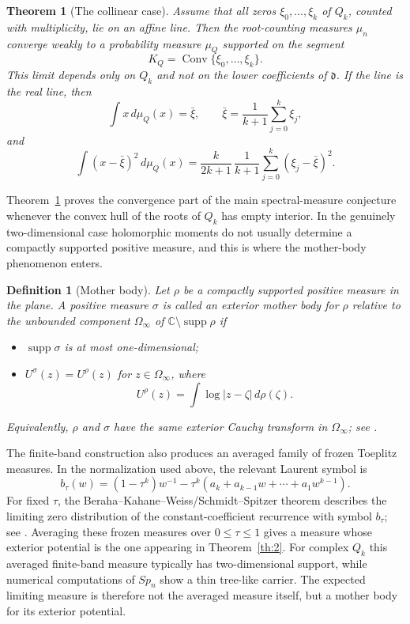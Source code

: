 \documentclass[10pt,twoside,a4paper,reqno]{amsart}
\theoremstyle{plain}
\newtheorem{theo}           {Theorem}
\newtheorem{defi}           {Definition}
\theoremstyle{definition}
\theoremstyle{remark}
\newenvironment{theorem}{\begin{theo}}{\end{theo}}
\newenvironment{definition}{\begin{defi}}{\end{defi}}
\newcommand {\dq}{\mathfrak d}
\DeclareMathOperator{\Conv}{Conv}
\begin{document}
\begin{theorem}[The collinear case]\label{th:collinear-convergence}
Assume that all zeros $\xi_0,\ldots,\xi_k$ of $Q_k$, counted with multiplicity,
lie on an affine line.  Then the root-counting measures $\mu_n$ converge weakly
to a probability measure $\mu_Q$ supported on the segment
\[
        K_Q=\Conv\{\xi_0,\ldots,\xi_k\}.
\]
This limit depends only on $Q_k$ and not on the lower coefficients of $\dq$.
If the line is the real line, then
\[
        \int x\,d\mu_Q(x)=\bar\xi,
        \qquad
        \bar\xi=\frac1{k+1}\sum_{j=0}^{k}\xi_j,
\]
and
\[
        \int (x-\bar\xi)^2\,d\mu_Q(x)
        =\frac{k}{2k+1}\,\frac1{k+1}\sum_{j=0}^{k}(\xi_j-\bar\xi)^2 .
\]
\end{theorem}

Theorem~\ref{th:collinear-convergence} proves the convergence part of the main
spectral-measure conjecture whenever the convex hull of the roots of $Q_k$ has
empty interior.  In the genuinely two-dimensional case holomorphic moments do not
usually determine a compactly supported positive measure, and this is where the
mother-body phenomenon enters.

\begin{definition}[Mother body]\label{def:mother-body}
Let $\rho$ be a compactly supported positive measure in the plane.  A positive
measure $\sigma$ is called an \emph{exterior mother body} for $\rho$ relative to
the unbounded component $\Omega_\infty$ of
$\mathbb C\setminus\operatorname{supp}\rho$ if
\begin{itemize}
\item $\operatorname{supp}\sigma$ is at most one-dimensional;
\item $U^\sigma(z)=U^\rho(z)$ for $z\in\Omega_\infty$, where
\[
        U^\rho(z)=\int\log|z-\zeta|\,d\rho(\zeta).
\]
\end{itemize}
Equivalently, $\rho$ and $\sigma$ have the same exterior Cauchy transform in
$\Omega_\infty$; see \cite{ShBook}.
\end{definition}

The finite-band construction also produces an averaged family of frozen
Toeplitz measures.  In the normalization used above, the relevant Laurent symbol
is
\begin{equation}\label{eq:symbol-intro}
        b_\tau(w)=(1-\tau^k)w^{-1}
        -\tau^k(a_k+a_{k-1}w+\cdots+a_1w^{k-1}).
\end{equation}
For fixed $\tau$, the Beraha--Kahane--Weiss/Schmidt--Spitzer theorem describes
the limiting zero distribution of the constant-coefficient recurrence with symbol
$b_\tau$; see \cite{BKW,SS,BBS2}.  Averaging these frozen measures over
$0\le\tau\le1$ gives a measure whose exterior potential is the one appearing in
Theorem~\ref{th:2}.  For complex $Q_k$ this averaged finite-band measure typically has 
 two-dimensional support, while numerical computations of $Sp_n$ show a
thin tree-like carrier.  The expected limiting measure is therefore not the
averaged measure itself, but a mother body for its exterior potential.
\end{document}
